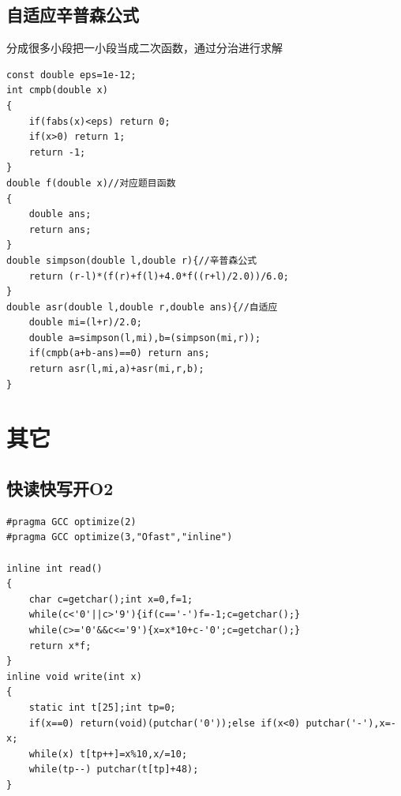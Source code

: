 \documentclass[12pt, a4paper, oneside]{ctexart}
\begin{document}
\newpage 
\subsection{自适应辛普森公式} 
分成很多小段把一小段当成二次函数，通过分治进行求解
\begin{lstlisting}
const double eps=1e-12;
int cmpb(double x)
{
    if(fabs(x)<eps) return 0;
    if(x>0) return 1;
    return -1;
}
double f(double x)//对应题目函数 
{
	double ans;
	return ans;
}
double simpson(double l,double r){//辛普森公式 
	return (r-l)*(f(r)+f(l)+4.0*f((r+l)/2.0))/6.0;
}
double asr(double l,double r,double ans){//自适应 
	double mi=(l+r)/2.0;
	double a=simpson(l,mi),b=(simpson(mi,r));
	if(cmpb(a+b-ans)==0) return ans;
	return asr(l,mi,a)+asr(mi,r,b);
}
\end{lstlisting}

\newpage 
\section{其它} 
\subsection{快读快写开O2} 
\begin{lstlisting}
#pragma GCC optimize(2)
#pragma GCC optimize(3,"Ofast","inline")

inline int read()
{
    char c=getchar();int x=0,f=1;
    while(c<'0'||c>'9'){if(c=='-')f=-1;c=getchar();}
    while(c>='0'&&c<='9'){x=x*10+c-'0';c=getchar();}
    return x*f;
}
inline void write(int x)
{
	static int t[25];int tp=0;
	if(x==0) return(void)(putchar('0'));else if(x<0) putchar('-'),x=-x;
	while(x) t[tp++]=x%10,x/=10;
	while(tp--) putchar(t[tp]+48);
}
\end{lstlisting}

\newpage 
\end{document}
